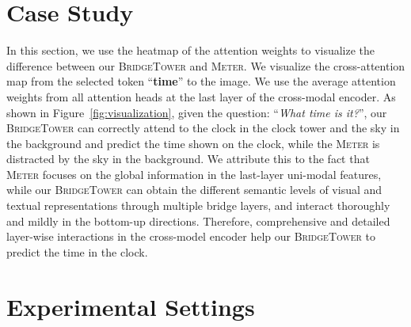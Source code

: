 \documentclass[letterpaper]{article} %
\newcommand{\tablestyle}[2]{\setlength{\tabcolsep}{#1}\renewcommand{\arraystretch}{#2}\centering\footnotesize}
\newcommand{\methodname}[0]{\textsc{BridgeTower}}
\newcommand{\metername}[0]{\textsc{Meter}}
\begin{document}
\begin{table}[t]
  \tablestyle{5pt}{1.0}
  \caption{
    Statistics of the pre-training datasets. We remove duplicate image-caption pairs in VG~\citep{kim2021vilt, dou2021meter} and only 2.9M image-caption pairs can be downloaded in CC.
  }
  \label{tab:statistics_pretrain}
\end{table}

\section{Case Study}

In this section, we use the heatmap of the attention weights to visualize the difference between our \methodname{} and \metername{}.
We visualize the cross-attention map from the selected token ``\textbf{time}'' to the image. We use the average attention weights from all attention heads at the last layer of the cross-modal encoder.
As shown in Figure~\ref{fig:visualization}, given the question: ``\textit{What time is it?}'', our \methodname{} can correctly attend to the clock in the clock tower and the sky in the background and predict the time shown on the clock, while the \metername{} is distracted by the sky in the background.
We attribute this to the fact that \metername{} focuses on the global information in the last-layer uni-modal features, while our \methodname{} can obtain the different semantic levels of visual and textual representations through multiple bridge layers, and interact thoroughly and mildly in the bottom-up directions. Therefore, comprehensive and detailed layer-wise interactions in the cross-model encoder help our \methodname{} to predict the time in the clock.

\section{Experimental Settings}
\end{document}
